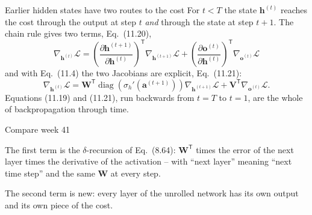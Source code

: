 \documentclass[10pt,aspectratio=169]{beamer}
\begin{document}
\begin{frame}{Earlier hidden states have two routes to the cost}
For $t<T$ the state $\bm{h}^{(t)}$ reaches the cost through the output at
step $t$ \emph{and} through the state at step $t+1$.  The chain rule gives
two terms, Eq.~(11.20),
\[
  \boxed{\;
  \nabla_{\bm{h}^{(t)}}\mathcal{L}
  =\left(\frac{\partial\bm{h}^{(t+1)}}{\partial\bm{h}^{(t)}}\right)^{\!\mathsf{T}}
   \nabla_{\bm{h}^{(t+1)}}\mathcal{L}
  +\left(\frac{\partial\bm{o}^{(t)}}{\partial\bm{h}^{(t)}}\right)^{\!\mathsf{T}}
   \nabla_{\bm{o}^{(t)}}\mathcal{L}\;}
\]
and with Eq.~(11.4) the two Jacobians are explicit, Eq.~(11.21):
\[
  \nabla_{\bm{h}^{(t)}}\mathcal{L}
  =\bm{W}^{\mathsf{T}}\operatorname{diag}\!\left(\sigma_h'(\bm{a}^{(t+1)})\right)
   \nabla_{\bm{h}^{(t+1)}}\mathcal{L}
  +\bm{V}^{\mathsf{T}}\nabla_{\bm{o}^{(t)}}\mathcal{L}.
\]
Equations (11.19) and (11.21), run backwards from $t=T$ to $t=1$, are the
whole of backpropagation through time.
\end{frame}

\begin{frame}{Compare week 41}
\begin{block}{The first term}
is the $\delta$-recursion of Eq.~(8.64): $\bm{W}^{\mathsf{T}}$ times the
error of the next layer times the derivative of the activation -- with
``next layer'' meaning ``next time step'' and the same $\bm{W}$ at every
step.
\end{block}
\begin{block}{The second term}
is new: every layer of the unrolled network has its own output and its own
piece of the cost.
\end{block}
\end{frame}
\end{document}
